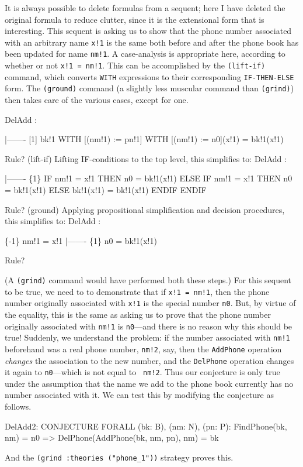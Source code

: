 It is always possible to delete formulas from a sequent; here I have
deleted the original formula to reduce clutter, since it is the
extensional form that is interesting.  This sequent is asking us to
show that the phone number associated with an arbitrary name {\tt x!1}
is the same both before and after the phone book has been updated for
name {\tt nm!1}.  A case-analysis is appropriate here, according to
whether or not {\tt x!1 = nm!1}.  This can be accomplished by
the {\tt (lift-if)} command, which converts {\tt WITH} expressions to
their corresponding {\tt IF-THEN-ELSE} form.  The {\tt (ground)}
command (a slightly less muscular command than {\tt (grind)}) then
takes care of the various cases, except for one.
\begin{jmrsession}
DelAdd :  

  |-------
[1]   bk!1 WITH [(nm!1) := pn!1] WITH [(nm!1) := n0](x!1) = bk!1(x!1)

Rule? (lift-if)
Lifting IF-conditions to the top level,
this simplifies to: 
DelAdd :  

  |-------
\{1\}   IF nm!1 = x!1 THEN n0 = bk!1(x!1)
      ELSE IF nm!1 = x!1 THEN n0 = bk!1(x!1)
        ELSE bk!1(x!1) = bk!1(x!1)
        ENDIF
      ENDIF

Rule? (ground)
Applying propositional simplification and decision procedures,
this simplifies to: 
DelAdd :  

\{-1\}   nm!1 = x!1
  |-------
\{1\}   n0 = bk!1(x!1)

Rule?
\end{jmrsession}
(A {\tt (grind)} command would have performed both these steps.)
For this sequent to be true, we need to to demonstrate
that if {\tt x!1 = nm!1}, then the phone number originally associated
with {\tt x!1} is the special number {\tt n0}.  But, by virtue of the
equality, this is the same as asking us to prove that the phone number
originally associated with {\tt nm!1} is {\tt n0}---and there is no
reason why this should be true!  Suddenly, we understand the problem:
if the number associated with {\tt nm!1} beforehand was a real phone
number, {\tt nm!2}, say, then the {\tt AddPhone} operation {\em
changes\/} the association to the new number, and the {\tt DelPhone}
operation changes it again to {\tt n0}---which is not equal to {\tt
nm!2}.  Thus our conjecture is only true under the assumption that the
name we add to the phone book currently has no number associated with it.
We can test this by modifying the conjecture as follows.
\begin{jmrsession}
  DelAdd2: CONJECTURE  FORALL (bk: B), (nm: N), (pn: P):
    FindPhone(bk, nm) = n0 => DelPhone(AddPhone(bk, nm, pn), nm) = bk
\end{jmrsession}
And the {\tt (grind :theories ("phone\_1"))} strategy proves this.

